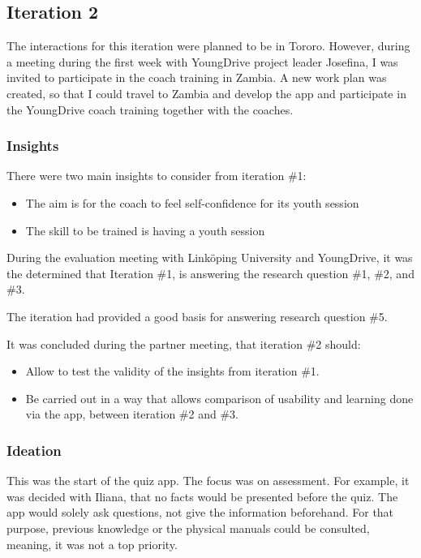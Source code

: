 \subsection{Iteration 2}

The interactions for this iteration were planned to be in Tororo. However, during a meeting during the first week with YoungDrive project leader Josefina, I was invited to participate in the coach training in Zambia. A new work plan was created, so that I could travel to Zambia and develop the app and participate in the YoungDrive coach training together with the coaches.

\subsubsection*{Insights}

There were two main insights to consider from iteration \#1:

\begin{itemize}
\item The aim is for the coach to feel self-confidence for its youth session
\item The skill to be trained is having a youth session
\end{itemize}

During the evaluation meeting with Linköping University and YoungDrive, it was the determined that Iteration \#1, is answering the research question \#1, \#2, and \#3.

The iteration had provided a good basis for answering research question \#5.

It was concluded during the partner meeting, that iteration \#2 should:

\begin{itemize}
\item Allow to test the validity of the insights from iteration \#1.
\item Be carried out in a way that allows comparison of usability and learning done via the app, between iteration \#2 and \#3.
\end{itemize}

\subsubsection*{Ideation}

This was the start of the quiz app. The focus was on assessment. For example, it was decided with Iliana, that no facts would be presented before the quiz. The app would solely ask questions, not give the information beforehand. For that purpose, previous knowledge or the physical manuals could be consulted, meaning, it was not a top priority.

